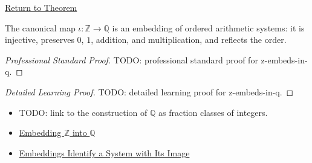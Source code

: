 \newpage
{}
\label{prf:z-embeds-in-q}

\begin{remark*}[Return]
\hyperref[thm:z-embeds-in-q]{Return to Theorem}
\end{remark*}

\begin{theorem*}[$Z$ Embeds in $Q$]
The canonical map $\iota:\mathbb{Z}\to \mathbb{Q}$ is an embedding of ordered arithmetic systems: it is injective, preserves $0$, $1$, addition, and multiplication, and reflects the order.
\end{theorem*}

\begin{proof}[Professional Standard Proof]
\LRAProofBodyStart
TODO: professional standard proof for z-embeds-in-q.
\end{proof}

\begin{proof}[Detailed Learning Proof]
\LRAProofBodyStart
TODO: detailed learning proof for z-embeds-in-q.
\end{proof}

\begin{remark*}
\end{remark*}

\begin{dependencies}
\begin{itemize}
  \item TODO: link to the construction of $\mathbb{Q}$ as fraction classes of integers.
  \item \hyperref[def:embedding-z-into-q]{Embedding $\mathbb{Z}$ into $\mathbb{Q}$}
  \item \hyperref[thm:embedding-identifies-with-image]{Embeddings Identify a System with Its Image}
\end{itemize}
\end{dependencies}

\clearpage
